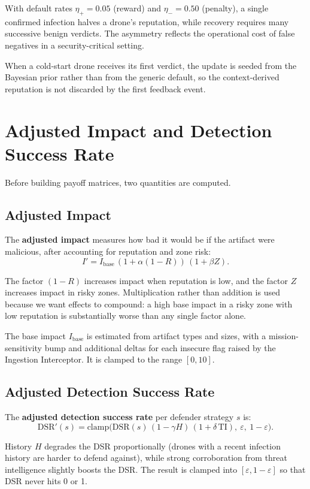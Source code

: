 \documentclass[12pt, a4paper]{report}
\begin{document}
With default rates $\eta_+ = 0.05$ (reward) and $\eta_- = 0.50$
(penalty), a single confirmed infection halves a drone's reputation,
while recovery requires many successive benign verdicts. The asymmetry
reflects the operational cost of false negatives in a
security-critical setting.

When a cold-start drone receives its first verdict, the update is
seeded from the Bayesian prior rather than from the generic default,
so the context-derived reputation is not discarded by the first
feedback event.

\section{Adjusted Impact and Detection Success Rate}

Before building payoff matrices, two quantities are computed.

\subsection{Adjusted Impact}

The \textbf{adjusted impact} measures how bad it would be if the
artifact were malicious, after accounting for reputation and zone risk:
\[
I' = I_{\text{base}} \, (1 + \alpha (1 - R)) \, (1 + \beta Z).
\]

The factor $(1 - R)$ increases impact when reputation is low, and the
factor $Z$ increases impact in risky zones. Multiplication rather than
addition is used because we want effects to compound: a high base
impact in a risky zone with low reputation is substantially worse than
any single factor alone.

The base impact $I_{\text{base}}$ is estimated from artifact types and
sizes, with a mission-sensitivity bump and additional deltas for each
insecure flag raised by the Ingestion Interceptor. It is clamped to
the range $[0, 10]$.

\subsection{Adjusted Detection Success Rate}

The \textbf{adjusted detection success rate} per defender strategy $s$
is:
\[
\mathrm{DSR}'(s) = \text{clamp}\!\Big(\mathrm{DSR}(s) \, (1 - \gamma H) \, (1 + \delta \, \mathrm{TI}),
\ \varepsilon,\ 1 - \varepsilon\Big).
\]

History $H$ degrades the DSR proportionally (drones with a recent
infection history are harder to defend against), while strong
corroboration from threat intelligence slightly boosts the DSR. The
result is clamped into $[\varepsilon, 1 - \varepsilon]$ so that DSR
never hits 0 or 1.
\end{document}

